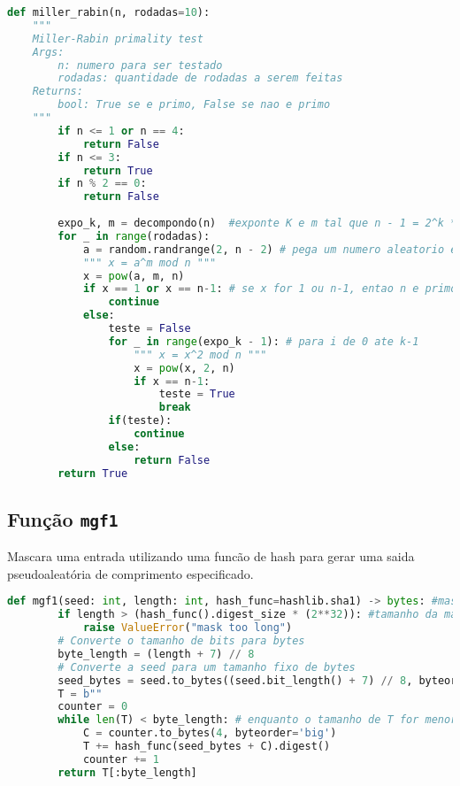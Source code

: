 \documentclass{article}
\begin{document}
\begin{lstlisting}[language=Python]
    def miller_rabin(n, rodadas=10):
    """
    Miller-Rabin primality test
    Args:
        n: numero para ser testado
        rodadas: quantidade de rodadas a serem feitas
    Returns:
        bool: True se e primo, False se nao e primo
    """
        if n <= 1 or n == 4:
            return False
        if n <= 3:
            return True
        if n % 2 == 0:
            return False
        
        expo_k, m = decompondo(n)  #exponte K e m tal que n - 1 = 2^k * m
        for _ in range(rodadas):
            a = random.randrange(2, n - 2) # pega um numero aleatorio entre 2 e n-2
            """ x = a^m mod n """
            x = pow(a, m, n) 
            if x == 1 or x == n-1: # se x for 1 ou n-1, entao n e primo
                continue
            else:
                teste = False
                for _ in range(expo_k - 1): # para i de 0 ate k-1
                    """ x = x^2 mod n """ 
                    x = pow(x, 2, n)
                    if x == n-1:
                        teste = True
                        break
                if(teste):
                    continue
                else:
                    return False
        return True
    \end{lstlisting}

\subsection{Função \texttt{mgf1}}
Mascara uma entrada utilizando uma funcão de hash para gerar uma saida pseudoaleatória de comprimento especificado.

\begin{lstlisting}[language=Python]
    def mgf1(seed: int, length: int, hash_func=hashlib.sha1) -> bytes: #mascara de geracao de funcao
        if length > (hash_func().digest_size * (2**32)): #tamanho da mascara 
            raise ValueError("mask too long")
        # Converte o tamanho de bits para bytes
        byte_length = (length + 7) // 8
        # Converte a seed para um tamanho fixo de bytes
        seed_bytes = seed.to_bytes((seed.bit_length() + 7) // 8, byteorder='big')
        T = b""
        counter = 0
        while len(T) < byte_length: # enquanto o tamanho de T for menor que o tamanho de bytes
            C = counter.to_bytes(4, byteorder='big')
            T += hash_func(seed_bytes + C).digest()
            counter += 1
        return T[:byte_length]
    \end{lstlisting}
\end{document}
